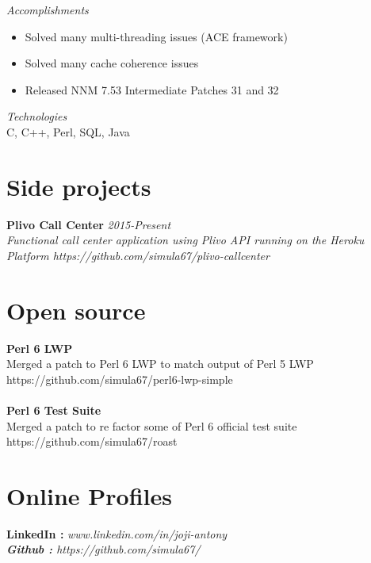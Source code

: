 \documentclass[line,margin]{res}
\begin{document}
\begin{resume}
{\it{Accomplishments}}\\
\begin{itemize}
\item Solved many multi-threading issues (ACE framework)
\item Solved many cache coherence issues
\item Released NNM 7.53 Intermediate Patches 31 and 32
\end{itemize}


{\it{Technologies}}\\
C, C++, Perl, SQL, Java

\section{Side projects}
{\bf Plivo Call Center} \hfill \it{2015-Present}\\
Functional call center application using Plivo API running on the Heroku Platform
https://github.com/simula67/plivo-callcenter\\


\section{Open source}
{\bf Perl 6 LWP}\\
Merged a patch to Perl 6 LWP to match output of Perl 5 LWP\\
https://github.com/simula67/perl6-lwp-simple\\ \\
{\bf Perl 6 Test Suite}\\
Merged a patch to re factor some of Perl 6 official test suite\\
https://github.com/simula67/roast\\

\section{Online Profiles}
{\bf LinkedIn :} \it{www.linkedin.com/in/joji-antony} \\
{\bf Github :} \it{https://github.com/simula67/} \\

\end{resume}
\end{document}
